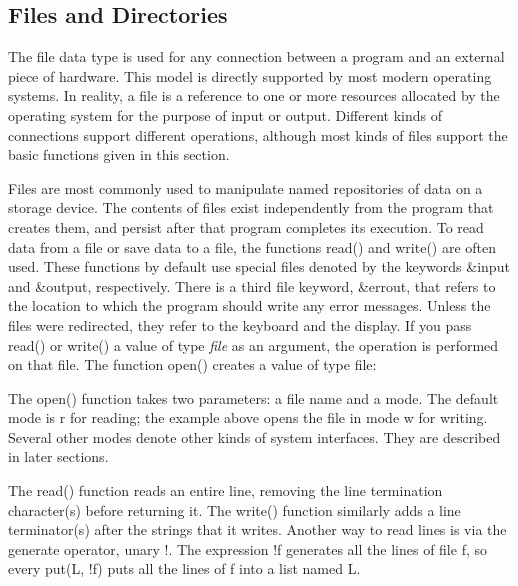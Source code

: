 \subsection{Files and Directories}

The file data type is used for any connection between a program and an
external piece of hardware. This model is directly supported by most
modern operating systems. In reality, a file is a
reference to one or more resources allocated by
the operating system for the purpose of input or output. Different
kinds of connections support different operations, although most kinds
of files support the basic functions given in this section.

Files are most commonly used to manipulate named repositories of data on
a storage device. The contents of files exist independently from the
program that creates them, and persist after that program completes its
execution. To read data from a file or save data to a file, the
functions \textsf{read()} and
\textsf{write()} are often used. These functions by
default use special files denoted by the keywords \textsf{\&input} and \textsf{\&output}, respectively. There is a third file
keyword, \textsf{\&errout}, that refers
to the location to which the program should write any error messages.
Unless the files were redirected, they refer to the
keyboard and the display. If you pass
\textsf{read()} or \textsf{write()} a value of type \textit{file} as an
argument, the operation is performed on that file. The function
\textsf{open()}\textsf{ }creates a value of type file:


The \textsf{open()} function takes two parameters: a file
name and a mode. The default mode is
\textsf{{\textquotedbl}r{\textquotedbl}} for reading; the example above
opens the file in mode \textsf{{\textquotedbl}w{\textquotedbl}} for
writing. Several other modes denote other kinds of system interfaces.
They are described in later sections.

The \textsf{read()} function reads an entire line, removing the line
termination character(s) before returning it. The \textsf{write()}
function similarly adds a line terminator(s) after the strings that it
writes. Another way to read lines is via the generate operator, unary
\textsf{!}. The expression \textsf{!f} generates all the lines of file
\textsf{f}, so \textsf{every put(L, !f)} puts all the lines of
\textsf{f} into a list named \textsf{L}.

